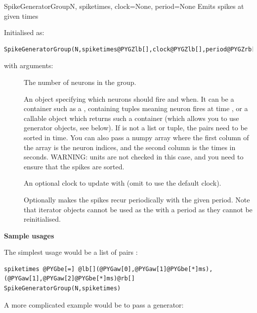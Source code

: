 \documentclass[letterpaper,10pt,english]{manual}
\begin{document}
\hypertarget{brian.SpikeGeneratorGroup}{}\begin{classdesc}{SpikeGeneratorGroup}{N, spiketimes, clock=None, period=None}
Emits spikes at given times

Initialised as:

\begin{Verbatim}[commandchars=@\[\]]
SpikeGeneratorGroup(N,spiketimes@PYGZlb[],clock@PYGZlb[],period@PYGZrb[]@PYGZrb[])
\end{Verbatim}

with arguments:
\begin{description}
\item[]
The number of neurons in the group.

\item[]
An object specifying which neurons should fire and when. It can be a container
such as a , containing tuples  meaning neuron  fires at
time , or a callable object which returns such a container (which
allows you to use generator objects, see below). If  is not
a list or tuple, the pairs  need to be sorted in time. You can
also pass a numpy array  where the first column of the
array is the neuron indices, and the second column is the times in
seconds. WARNING: units are not checked in this case, and you need to
ensure that the spikes are sorted.

\item[]
An optional clock to update with (omit to use the default clock).

\item[]
Optionally makes the spikes recur periodically with the given
period. Note that iterator objects cannot be used as the 
with a period as they cannot be reinitialised.

\end{description}

\textbf{Sample usages}

The simplest usage would be a list of pairs :

\begin{Verbatim}[commandchars=@\[\]]
spiketimes @PYGbe[=] @lb[](@PYGaw[0],@PYGaw[1]@PYGbe[*]ms), (@PYGaw[1],@PYGaw[2]@PYGbe[*]ms)@rb[]
SpikeGeneratorGroup(N,spiketimes)
\end{Verbatim}

A more complicated example would be to pass a generator:


\end{classdesc}
\end{document}
